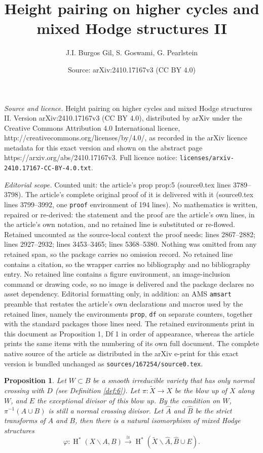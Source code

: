 \documentclass[10pt,a4paper]{amsart}
\title{Height pairing on higher cycles and mixed Hodge structures II}
\author{J.I. Burgos Gil, S. Goswami, G. Pearlstein}
\date{Source: arXiv:2410.17167v3 (CC BY 4.0)}
\newtheorem{prop}{Proposition}
\DeclareMathOperator{\rH}{H}
\begin{document}
\maketitle

\noindent\emph{Source and licence.} Height pairing on higher cycles and mixed Hodge structures II. Version arXiv:2410.17167v3 (CC BY 4.0), distributed by arXiv under the Creative Commons Attribution 4.0 International licence, http://creativecommons.org/licenses/by/4.0/, as recorded in the arXiv licence metadata for this exact version and shown on the abstract page https://arxiv.org/abs/2410.17167v3. Full licence notice: \texttt{licenses/arxiv-2410.17167-CC-BY-4.0.txt}.\par\smallskip

\noindent\textit{Editorial scope.} Counted unit: the article's prop prop:5 (source0.tex lines 3789--3798). The article's complete original proof of it is delivered with it (source0.tex lines 3799--3992, one \texttt{proof} environment of 194 lines). No mathematics is written, repaired or re-derived: the statement and the proof are the article's own lines, in the article's own notation, and no retained line is substituted or re-flowed.  Retained uncounted as the source-local context the proof needs: lines 2867--2882; lines 2927--2932; lines 3453--3465; lines 5368--5380.  Nothing was omitted from any retained span, so the package carries no omission record.  No retained line contains a citation, so the wrapper carries no bibliography and no bibliography entry.  No retained line contains a figure environment, an image-inclusion command or drawing code, so no image is delivered and the package declares no asset dependency.  Editorial formatting only, in addition: an AMS \texttt{amsart} preamble that restates the article's own declarations and macros used by the retained lines, namely the environments \texttt{prop}, \texttt{df} on separate counters, together with the standard packages those lines need.  The retained environments print in this document as Proposition 1, Df 1 in order of appearance, whereas the article prints the same items with the numbering of its own full document.  The complete native source of the article as distributed in the arXiv e-print for this exact version is bundled unchanged as \texttt{sources/167254/source0.tex}.
\begin{prop}\label{prop:6}  Let $W\subset B$ be a smooth
  irreducible variety that has only normal crossing with $D$ (see
  Definition \ref{def:6}). Let
  $\pi\colon \widetilde X\rightarrow X$ be the blow up of $X$ along
  $W$, and $E$ the exceptional divisor of this blow up. By the
  condition on $W$,  $\pi^{-1}(A\cup B)$ is still a normal 
  crossing divisor. Let
  $\widehat A$ and $\widehat B$ be the strict transforms of $A$ and
  $B$, then there is a natural isomorphism of mixed Hodge structures
  \begin{equation}\label{eq:10}
    \varphi \colon \rH^{\ast}(X\smallsetminus A,B)
    \xrightarrow{\cong}
    \rH^{\ast}(\widetilde X\smallsetminus \widehat A,\widehat
    B\cup E).
  \end{equation}
\end{prop}
\end{document}
